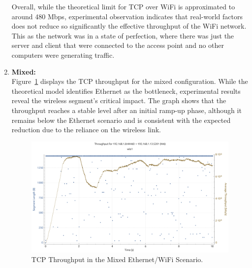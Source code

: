 \begin{enumerate}

                Overall, while the theoretical limit for TCP over WiFi is approximated to around 480 Mbps, experimental observation indicates that real-world factors does not reduce so significantly the effective throughput of the WiFi network. This as the network was in a state of perfection, where there was just the server and client that were connected to the access point and no other computers were generating traffic.

            \vspace{0.2cm} %

            \item \textbf{Mixed:} \\
                Figure~\ref{fig:throughput-mix-tcp} displays the TCP throughput for the mixed configuration. 
                While the theoretical model identifies Ethernet as the bottleneck, experimental results reveal the wireless segment’s critical impact. The graph shows that the throughput reaches a stable level after an initial ramp-up phase, although it remains below the Ethernet scenario and is consistent with the expected reduction due to the reliance on the wireless link.

                \begin{figure}[ht]
                    \centering
                    \includegraphics[width=0.9\columnwidth]{images/graphs/Throughput/Throughput_MIX_TCP.pdf}
                    \caption{TCP Throughput in the Mixed Ethernet/WiFi Scenario.}
                    \label{fig:throughput-mix-tcp}
                \end{figure}


\end{enumerate}
